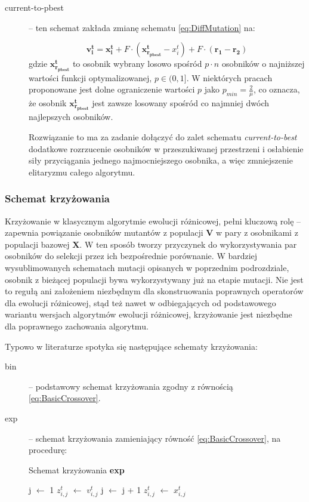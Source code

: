 \documentclass[12pt,a4paper]{report}
\begin{document}
{{{{\begin{description}
\item[current-to-pbest] \cite{JADE} -- ten schemat zakłada zmianę schematu \ref{eq:DiffMutation} na:

\begin{equation}
\mathbf{v_i^{t}} = \mathbf{x_i^t} + F \cdot (\mathbf{x_{r_{pbest}}^t} - x_i^t) + F \cdot (\mathbf{r_1} - \mathbf{r_{2}})
\end{equation}
gdzie $\mathbf{x_{r_{pbest}}^t}$ to osobnik wybrany losowo spośród $p \cdot n$ osobników o najniższej wartości funkcji optymalizowanej, $p \in (0,1]$. W niektórych pracach \cite{SHADE} proponowane jest dolne ograniczenie wartości $p$ jako $p_{min} = \frac{2}{\mu}$, co oznacza, że osobnik $\mathbf{x_{r_{pbest}}^t}$ jest zawsze losowany spośród co najmniej dwóch najlepszych osobników.

Rozwiązanie to ma za zadanie dołączyć do zalet schematu \emph{current-to-best} dodatkowe rozrzucenie osobników w przeszukiwanej przestrzeni i osłabienie siły przyciągania jednego najmocniejszego osobnika, a więc zmniejszenie elitaryzmu całego algorytmu.




\end{description}
}
\subsubsection{Schemat krzyżowania}
\par{
Krzyżowanie w klasycznym algorytmie ewolucji różnicowej, pełni kluczową rolę -- zapewnia powiązanie osobników mutantów z populacji $\mathbf{V}$ w pary z osobnikami z populacji bazowej $\mathbf{X}$. W ten sposób tworzy przyczynek do wykorzystywania par osobników do selekcji przez ich bezpośrednie porównanie. W bardziej wysublimowanych schematach mutacji opisanych w poprzednim podrozdziale, osobnik z bieżącej populacji bywa wykorzystywany już na etapie mutacji. Nie jest to regułą ani założeniem niezbędnym dla skonstruowania poprawnych operatorów dla ewolucji różnicowej, stąd też nawet w odbiegających od podstawowego wariantu wersjach algorytmów ewolucji różnicowej, krzyżowanie jest niezbędne dla poprawnego zachowania algorytmu.
}

\par{
Typowo w literaturze spotyka się następujące schematy krzyżowania:
\begin{description}
\item[bin] -- podstawowy schemat krzyżowania zgodny z równością \ref{eq:BasicCrossover}.
\item[exp] -- schemat krzyżowania zamieniający równość \ref{eq:BasicCrossover}, na procedurę:
\begin{algorithm}[H]
\caption{Schemat krzyżowania \textbf{exp}}
\label{algorithm:ea}
\begin{algorithmic}[1]
\State j $\gets$ 1
	\State $z_{i,j}^t$ $\gets$ $v_{i,j}^t$
	\State j $\gets$ j + 1
\EndWhile
{}
	\State $z_{i,j}^t$ $\gets$ $x_{i,j}^t$
\EndWhile
\end{algorithmic}
\end{algorithm}


\end{description}}}}}
\end{document}
